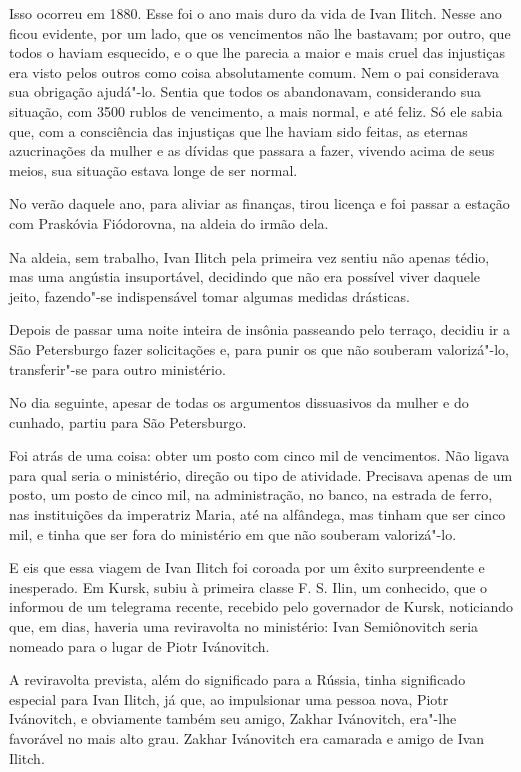 Isso ocorreu em 1880. Esse foi o ano mais duro da vida de Ivan Ilitch.
Nesse ano ficou evidente, por um lado, que os vencimentos não lhe
bastavam; por outro, que todos o haviam esquecido, e o que lhe parecia a
maior e mais cruel das injustiças era visto pelos outros como coisa
absolutamente comum. Nem o pai considerava sua obrigação ajudá"-lo.
Sentia que todos os abandonavam, considerando sua situação, com 3500
rublos de vencimento, a mais normal, e até feliz. Só ele sabia que, com
a consciência das injustiças que lhe haviam sido feitas, as eternas
azucrinações da mulher e as dívidas que passara a fazer, vivendo acima
de seus meios, sua situação estava longe de ser normal.

No verão daquele ano, para aliviar as finanças, tirou licença e foi
passar a estação com Praskóvia Fiódorovna, na aldeia do irmão dela.

Na aldeia, sem trabalho, Ivan Ilitch pela primeira vez sentiu não apenas
tédio, mas uma angústia insuportável, decidindo que não era possível
viver daquele jeito, fazendo"-se indispensável tomar algumas medidas
drásticas.

Depois de passar uma noite inteira de insônia passeando pelo terraço,
decidiu ir a São Petersburgo fazer solicitações e, para punir os que não
souberam valorizá"-lo, transferir"-se para outro ministério.

No dia seguinte, apesar de todas os argumentos dissuasivos da mulher e
do cunhado, partiu para São Petersburgo.

Foi atrás de uma coisa: obter um posto com cinco mil de vencimentos. Não
ligava para qual seria o ministério, direção ou tipo de atividade.
Precisava apenas de um posto, um posto de cinco mil, na administração,
no banco, na estrada de ferro, nas instituições da imperatriz Maria, até
na alfândega, mas tinham que ser cinco mil, e tinha que ser fora do
ministério em que não souberam valorizá"-lo.

E eis que essa viagem de Ivan Ilitch foi coroada por um êxito
surpreendente e inesperado. Em Kursk, subiu à primeira classe F. S.
Ilin, um conhecido, que o informou de um telegrama recente, recebido
pelo governador de Kursk, noticiando que, em dias, haveria uma
reviravolta no ministério: Ivan Semiônovitch seria nomeado para o lugar
de Piotr Ivánovitch.

A reviravolta prevista, além do significado para a Rússia, tinha
significado especial para Ivan Ilitch, já que, ao impulsionar uma pessoa
nova, Piotr Ivánovitch, e obviamente também seu amigo, Zakhar
Ivánovitch, era"-lhe favorável no mais alto grau. Zakhar Ivánovitch era
camarada e amigo de Ivan Ilitch.


